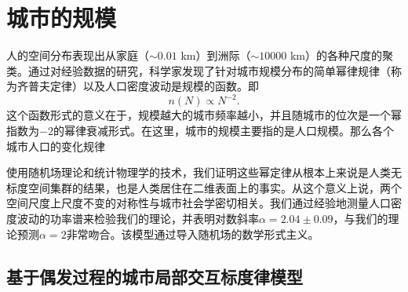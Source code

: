 \section{城市的规模}

人的空间分布表现出从家庭（$\sim 0.01$ km）到洲际（$\sim 10000$ km）的各种尺度的聚类。通过对经验数据的研究，科学家发现了针对城市规模分布的简单幂律规律（称为齐普夫定律）以及人口密度波动是规模的函数。即\[n(N) \propto N^{−2}.\] 这个函数形式的意义在于，规模越大的城市频率越小，并且随城市的位次是一个幂指数为$-2$的幂律衰减形式。在这里，城市的规模主要指的是人口规模。那么各个城市人口的变化规律

使用随机场理论和统计物理学的技术，我们证明这些幂定律从根本上来说是人类无标度空间集群的结果，也是人类居住在二维表面上的事实。从这个意义上说，两个空间尺度上尺度不变的对称性与城市社会学密切相关。我们通过经验地测量人口密度波动的功率谱来检验我们的理论，并表明对数斜率$\alpha= 2.04\pm0.09$，与我们的理论预测$\alpha= 2$非常吻合。该模型通过导入随机场的数学形式主义。

\subsection{基于偶发过程的城市局部交互标度律模型}

